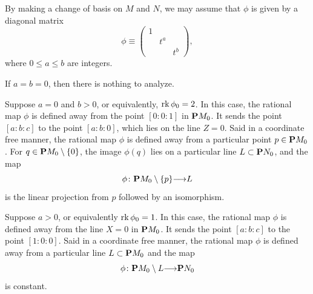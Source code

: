 \documentclass[12pt,reqno]{amsart}
\renewcommand{\to}{{\longrightarrow}}
\numberwithin{equation}{section}
\begin{document}
By making a change of basis on $M$ and $N$, we may assume that $\phi$ is given by a diagonal matrix
\[
  \phi \equiv
  \begin{pmatrix}
    1 & & \\
     & t^a & \\
    & & t^b
  \end{pmatrix},
\]
where $0 \leq a \leq b$ are integers.

If $a = b = 0$, then there is nothing to analyze.

Suppose $a = 0$ and $b > 0$, or equivalently, $\rk \phi_0 = 2$.
In this case, the rational map $\phi$ is defined away from the point $[0:0:1]$ in $\P M_0$.
It sends the point $[a:b:c]$ to the point $[a:b:0]$, which lies on the line $Z = 0$.
Said in a coordinate free manner, the rational map $\phi$ is defined away from a particular point $p \in \P M_0$.
For $q \in \P M_0 \setminus \{0\}$, the image $\phi(q)$ lies on a particular line $L \subset \P N_0$, and the map
\begin{equation}\label{eqn:rk2}
  \phi \colon \P M_0 \setminus \{p\} \to L
\end{equation}
is the linear projection from $p$ followed by an isomorphism.

Suppose $a > 0$, or equivalently $\rk \phi_0 = 1$.
In this case, the rational map $\phi$ is defined away from the line $X = 0$ in $\P M_0$.
It sends the point $[a:b:c]$ to the point $[1:0:0]$.
Said in a coordinate free manner, the rational map $\phi$ is defined away from a particular line $L \subset \P M_0$ and the map
\begin{equation}\label{eqn:rk1}
  \phi \colon \P M_0 \setminus L \to \P N_0
\end{equation}
is constant.
\end{document}
